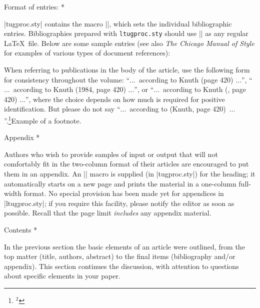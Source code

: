 \subsubhead * Format of entries: *
 
|tugproc.sty| contains the macro |\entry|, which sets the individual
bibliographic entries.  Bibliographies prepared with {\tt ltugproc.sty}
should use |\bibitem| as any regular \LaTeX\ file.  Below are some
sample entries (see also {\sl The Chicago Manual of Style\/} for
examples of various types of document references):
 
\medskip
 
 
 
 
 
\medskip
 
When referring to publications in the body of the article, use the
following form for consistency throughout the volume: ``$\ldots$\
according to Knuth (page 420) $\ldots$'', ``$\ldots$\ according to
Knuth (1984, page 420) $\ldots$'', or ``$\ldots$\ according to Knuth
(\TB, page 420) $\ldots$'', where the choice depends on how much is
required for positive identification.  But please do not say ``$\ldots$\
according to (Knuth, page 420)\ $\ldots$''.\footnote{$^2$}{Example of a
footnote.}
 
\subhead * Appendix *
 
Authors who wish to provide samples of input or output that will not
comfortably fit in the two-column format of their articles are
encouraged to put them in an appendix.  An |\appendix| macro is supplied
(in |tugproc.sty|) for the heading; it automatically starts on a new
page and prints the material in a one-column full-width format.  No
special provision has been made yet for appendices in |ltugproc.sty|;
if you require this facility, please notify the editor as soon as
possible.  Recall that the page limit {\it includes\/} any appendix
material.
 
\head * Contents *
 
In the previous section the basic elements of an article were outlined,
from the top matter (title, authors, abstract) to the final items
(bibliography and/or appendix).  This section continues the discussion,
with attention to questions about specific elements in your paper.
 
